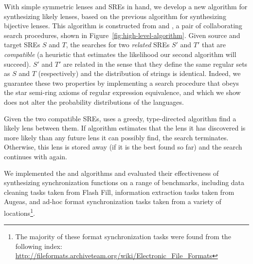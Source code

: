 \documentclass[acmsmall,screen,anonymous]{acmart}
\begin{document}
With simple symmetric lenses and SREs in hand, we develop a new algorithm for
synthesizing likely lenses, based on the previous algorithm for synthesizing
bijective lenses. This algorithm is constructed from \RXSearch and \GreedySynth,
a pair of collaborating search procedures, shown in
Figure~\ref{fig:high-level-algorithm}. Given source and target SREs $S$ and $T$,
the \RXSearch searches for two \emph{related} SREs $S'$ and $T'$ that are
\emph{compatible} (a heuristic that estimates the likelihood our second
algorithm will succeed). $S'$ and $T'$ are related in the sense that they define
the same regular sets as $S$ and $T$ (respectively) and the distribution of
strings is identical. Indeed, we guarantee these two properties by implementing
a search procedure that obeys the star semi-ring axioms of regular expression
equivalence, and which we show does not alter the probability distributions of
the languages.

Given the two compatible SREs, \GreedySynth uses a greedy, type-directed
algorithm find a likely lens between them. If algorithm estimates that the lens
it has discovered is more likely than any future lens it can possibly find, the
search terminates. Otherwise, this lens is stored away (if it is the best found
so far) and the search continues with \RXSearch again.

We implemented the \GreedySynth and \RXSearch algorithms and evaluated their
effectiveness of synthesizing synchronization functions on a range of
benchmarks, including data cleaning tasks taken from Flash Fill, information
extraction tasks taken from Augeas, and ad-hoc format synchronization tasks
taken from a variety of locations\footnote{The majority of these format
  synchronization tasks were found from the following index:
  \url{http://fileformats.archiveteam.org/wiki/Electronic_File_Formats}}.
\end{document}
